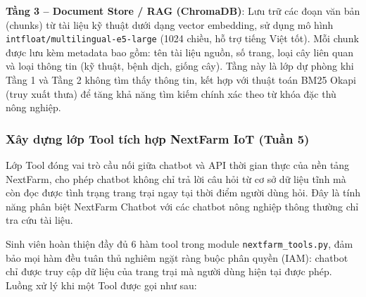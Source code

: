 \textbf{Tầng 3 -- Document Store / RAG (ChromaDB)}: Lưu trữ các đoạn văn bản (chunks) từ tài liệu kỹ thuật dưới dạng vector embedding, sử dụng mô hình \texttt{intfloat/multilingual-e5-large} (1024 chiều, hỗ trợ tiếng Việt tốt). Mỗi chunk được lưu kèm metadata bao gồm: tên tài liệu nguồn, số trang, loại cây liên quan và loại thông tin (kỹ thuật, bệnh dịch, giống cây). Tầng này là lớp dự phòng khi Tầng 1 và Tầng 2 không tìm thấy thông tin, kết hợp với thuật toán BM25 Okapi (truy xuất thưa) để tăng khả năng tìm kiếm chính xác theo từ khóa đặc thù nông nghiệp.


\begin{sodo}[H]
    \centering
    \label{fig:tri-layer-rag}
\end{sodo}

\subsubsection{Xây dựng lớp Tool tích hợp NextFarm IoT (Tuần 5)}

Lớp Tool đóng vai trò cầu nối giữa chatbot và API thời gian thực của nền tảng NextFarm, cho phép chatbot không chỉ trả lời câu hỏi từ cơ sở dữ liệu tĩnh mà còn đọc được tình trạng trang trại ngay tại thời điểm người dùng hỏi. Đây là tính năng phân biệt NextFarm Chatbot với các chatbot nông nghiệp thông thường chỉ tra cứu tài liệu.

Sinh viên hoàn thiện đầy đủ 6 hàm tool trong module \texttt{nextfarm\_tools.py}, đảm bảo mọi hàm đều tuân thủ nghiêm ngặt ràng buộc phân quyền (IAM): chatbot chỉ được truy cập dữ liệu của trang trại mà người dùng hiện tại được phép. Luồng xử lý khi một Tool được gọi như sau:

